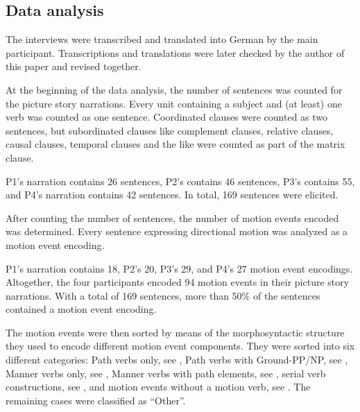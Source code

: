 \documentclass[output=paper,colorlinks,citecolor=brown]{langscibook}
\begin{document}
\subsection{Data analysis}

The interviews were transcribed and translated into German by the main participant. Transcriptions and translations were later checked by the author of this paper and revised together.

At the beginning of the data analysis, the number of sentences was counted for the picture story narrations. Every unit containing a subject and (at least) one verb was counted as one sentence. Coordinated clauses were counted as two sentences, but subordinated clauses like complement clauses, relative clauses, causal clauses, temporal clauses and the like were counted as part of the matrix clause.

P1’s narration contains 26 sentences, P2’s contains 46 sentences, P3’s contains 55, and P4’s narration contains 42 sentences. In total, 169 sentences were elicited.

After counting the number of sentences, the number of motion events encoded was determined. Every sentence expressing directional motion was analyzed as a motion event encoding.

P1’s narration contains 18, P2’s 20, P3’s 29, and P4’s 27 motion event encodings. Altogether, the four participants encoded 94 motion events in their picture story narrations. With a total of 169 sentences, more than 50\% of the sentences contained a motion event encoding.

The motion events were then sorted by means of the morphosyntactic structure they used to encode different motion event components. They were sorted into six different categories: Path verbs only, see , Path verbs with Ground-PP/NP, see , Manner verbs only, see , Manner verbs with path elements, see , serial verb constructions, see , and motion events without a motion verb, see . The remaining cases were classified as “Other”.
\end{document}
